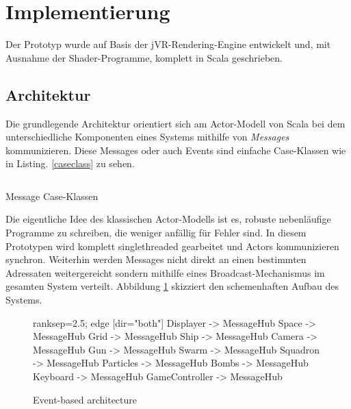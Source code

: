 \documentclass[a4paper]{article}
\begin{document}
\newpage
\section{Implementierung}
Der Prototyp wurde auf Basis der jVR-Rendering-Engine entwickelt und, mit Ausnahme der Shader-Programme, komplett in Scala geschrieben.

\subsection{Architektur}
Die grundlegende Architektur orientiert sich am Actor-Modell von Scala bei dem unterschiedliche Komponenten eines Systems mithilfe von \textit{Messages} kommunizieren. Diese Messages oder auch Events sind einfache Case-Klassen wie in Listing. \ref{caseclass} zu sehen. 

\begin{listing}[H]
\inputminted[firstline=6, lastline=9]{scala}{../scala/org/whiskeysierra/powpow/Messages.scala}
\caption{Message Case-Klassen}
\label{caseclass}
\end{listing}

Die eigentliche Idee des klassischen Actor-Modells ist es, robuste nebenläufige Programme zu schreiben, die weniger anfällig für Fehler sind. In diesem Prototypen wird komplett singlethreaded gearbeitet und Actors kommunizieren synchron. Weiterhin werden Messages nicht direkt an einen bestimmten Adressaten weitergereicht sondern mithilfe eines Broadcast-Mechanismus im gesamten System verteilt. Abbildung \ref{architecture} skizziert den schemenhaften Aufbau des Systems. 

\begin{figure}[H]
\centering
{} {
    ranksep=2.5;
    edge [dir="both"]
    Displayer -> MessageHub
    Space -> MessageHub
    Grid -> MessageHub
    Ship -> MessageHub
    Camera -> MessageHub
    Gun -> MessageHub
    Swarm -> MessageHub
    Squadron -> MessageHub
    Particles -> MessageHub
    Bombs -> MessageHub
    Keyboard -> MessageHub
    GameController -> MessageHub
}
\caption{Event-based architecture}
\label{architecture}
\end{figure}
\end{document}
